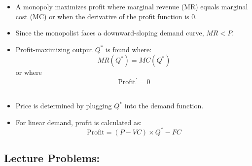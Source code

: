 \documentclass[
]{book}
\providecommand{\tightlist}{%
  \setlength{\itemsep}{0pt}\setlength{\parskip}{0pt}}
\begin{document}
\begin{enumerate}
  \begin{itemize}
  \tightlist
  \item
    A monopoly maximizes profit where marginal revenue (MR) equals marginal cost (MC) or when the derivative of the profit function is 0.
  \item
    Since the monopolist faces a downward-sloping demand curve, \(MR < P\).
  \item
    Profit-maximizing output \(Q^*\) is found where:
    \[
       MR(Q^*) = MC(Q^*)
       \] or where
    \[
       \text{Profit}^{\prime} = 0
       \]\\
  \item
    Price is determined by plugging \(Q^*\) into the demand function.
  \item
    For linear demand, profit is calculated as:
    \[
       \text{Profit} = (P - VC) \times Q^* - FC
       \]
  \end{itemize}
\end{enumerate}

\subsection*{Lecture Problems:}\label{lecture-problems-5}
\end{document}
